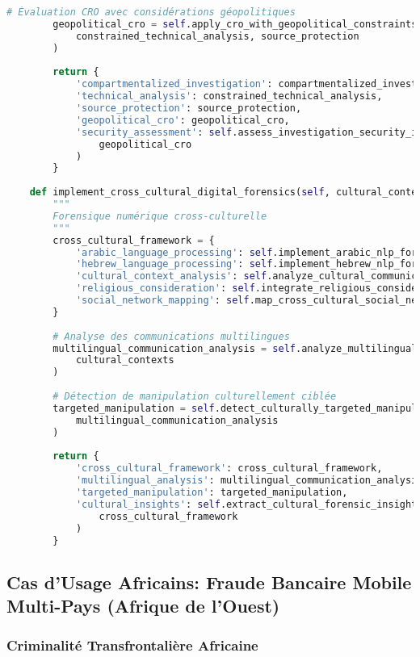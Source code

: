 \begin{lstlisting}[language=Python, caption=Investigation cyberterrorisme avec contraintes géopolitiques]
        # Évaluation CRO avec considérations géopolitiques
        geopolitical_cro = self.apply_cro_with_geopolitical_constraints(
            constrained_technical_analysis, source_protection
        )
        
        return {
            'compartmentalized_investigation': compartmentalized_investigation,
            'technical_analysis': constrained_technical_analysis,
            'source_protection': source_protection,
            'geopolitical_cro': geopolitical_cro,
            'security_assessment': self.assess_investigation_security_impact(
                geopolitical_cro
            )
        }
    
    def implement_cross_cultural_digital_forensics(self, cultural_contexts):
        """
        Forensique numérique cross-culturelle
        """
        cross_cultural_framework = {
            'arabic_language_processing': self.implement_arabic_nlp_forensics(),
            'hebrew_language_processing': self.implement_hebrew_nlp_forensics(),
            'cultural_context_analysis': self.analyze_cultural_communication_patterns(),
            'religious_consideration': self.integrate_religious_considerations(),
            'social_network_mapping': self.map_cross_cultural_social_networks()
        }
        
        # Analyse des communications multilingues
        multilingual_communication_analysis = self.analyze_multilingual_communications(
            cultural_contexts
        )
        
        # Détection de manipulation culturellement ciblée
        targeted_manipulation = self.detect_culturally_targeted_manipulation(
            multilingual_communication_analysis
        )
        
        return {
            'cross_cultural_framework': cross_cultural_framework,
            'multilingual_analysis': multilingual_communication_analysis,
            'targeted_manipulation': targeted_manipulation,
            'cultural_insights': self.extract_cultural_forensic_insights(
                cross_cultural_framework
            )
        }
\end{lstlisting}

\subsection{Cas d'Usage Africains: Fraude Bancaire Mobile Multi-Pays (Afrique de l'Ouest)}

\subsubsection{Criminalité Transfrontalière Africaine}

